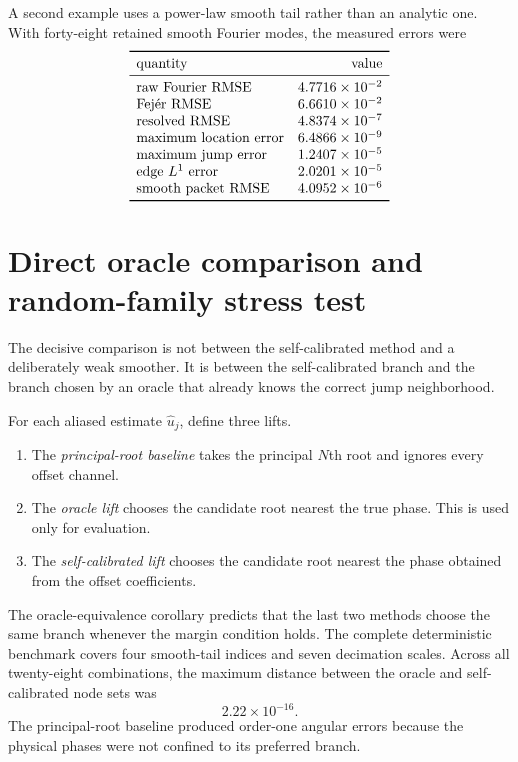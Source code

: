 \documentclass[11pt]{article}
\theoremstyle{remark}
\begin{document}
A second example uses a power-law smooth tail rather than an analytic one. With forty-eight retained smooth Fourier modes, the measured errors were
\[
\begin{array}{lr}
\toprule
\text{quantity}&\text{value}\\
\midrule
\text{raw Fourier RMSE}&4.7716\times10^{-2}\\
\text{Fej\'er RMSE}&6.6610\times10^{-2}\\
\text{resolved RMSE}&4.8374\times10^{-7}\\
\text{maximum location error}&6.4866\times10^{-9}\\
\text{maximum jump error}&1.2407\times10^{-5}\\
\text{edge }L^1\text{ error}&2.0201\times10^{-5}\\
\text{smooth packet RMSE}&4.0952\times10^{-6}\\
\bottomrule
\end{array}
\]

\section{Direct oracle comparison and random-family stress test}

The decisive comparison is not between the self-calibrated method and a deliberately weak smoother. It is between the self-calibrated branch and the branch chosen by an oracle that already knows the correct jump neighborhood.

For each aliased estimate $\widehat u_j$, define three lifts.

\begin{enumerate}
\item The \emph{principal-root baseline} takes the principal $N$th root and ignores every offset channel.
\item The \emph{oracle lift} chooses the candidate root nearest the true phase. This is used only for evaluation.
\item The \emph{self-calibrated lift} chooses the candidate root nearest the phase obtained from the offset coefficients.
\end{enumerate}

The oracle-equivalence corollary predicts that the last two methods choose the same branch whenever the margin condition holds. The complete deterministic benchmark covers four smooth-tail indices and seven decimation scales. Across all twenty-eight combinations, the maximum distance between the oracle and self-calibrated node sets was
\[
\boxed{2.22\times10^{-16}.}
\]
The principal-root baseline produced order-one angular errors because the physical phases were not confined to its preferred branch.
\end{document}
